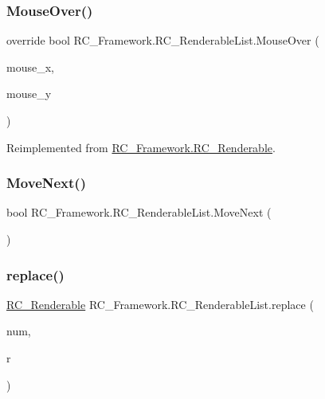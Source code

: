 \subsubsection{\texorpdfstring{Mouse\+Over()}{MouseOver()}}
{\footnotesize\ttfamily override bool R\+C\+\_\+\+Framework.\+R\+C\+\_\+\+Renderable\+List.\+Mouse\+Over (\begin{DoxyParamCaption}\item[{float}]{mouse\+\_\+x,  }\item[{float}]{mouse\+\_\+y }\end{DoxyParamCaption})\hspace{0.3cm}{\ttfamily [virtual]}}



Reimplemented from \mbox{\hyperlink{class_r_c___framework_1_1_r_c___renderable_abd55ea96d88d7bd2207e3a4ede1f1a05}{R\+C\+\_\+\+Framework.\+R\+C\+\_\+\+Renderable}}.

\mbox{\label{class_r_c___framework_1_1_r_c___renderable_list_a2974cbded928cdb237fadf5c8adbdd2c}} 
\subsubsection{\texorpdfstring{Move\+Next()}{MoveNext()}}
{\footnotesize\ttfamily bool R\+C\+\_\+\+Framework.\+R\+C\+\_\+\+Renderable\+List.\+Move\+Next (\begin{DoxyParamCaption}{ }\end{DoxyParamCaption})}

\mbox{\label{class_r_c___framework_1_1_r_c___renderable_list_abb4dfff8d5e8ac2e96034e591c96d811}} 
\subsubsection{\texorpdfstring{replace()}{replace()}}
{\footnotesize\ttfamily \mbox{\hyperlink{class_r_c___framework_1_1_r_c___renderable}{R\+C\+\_\+\+Renderable}} R\+C\+\_\+\+Framework.\+R\+C\+\_\+\+Renderable\+List.\+replace (\begin{DoxyParamCaption}\item[{int}]{num,  }\item[{\mbox{\hyperlink{class_r_c___framework_1_1_r_c___renderable}{R\+C\+\_\+\+Renderable}}}]{r }\end{DoxyParamCaption})}



